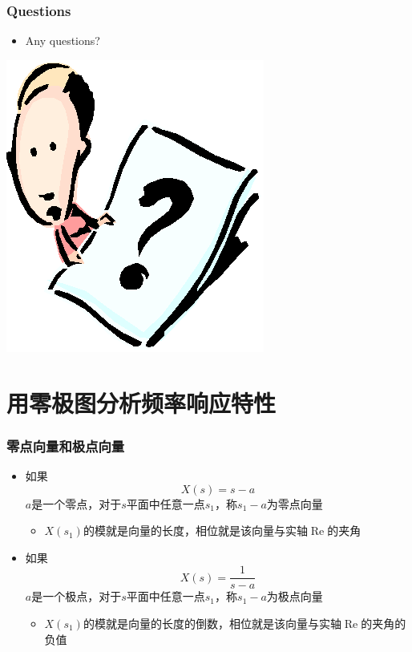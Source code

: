 \documentclass[CJKutf8,dvipsnames,table]{beamer}
\begin{document}
\begin{CJK*}{UTF8}{song}
  \begin{frame}
    \frametitle{Questions}
    \begin{itemize}
    \item Any questions?
    \end{itemize}
    \begin{center}
      \includegraphics[scale=.5]{question}
    \end{center}
  \end{frame}
  
  \section{用零极图分析频率响应特性}
  
  \begin{frame}
    \frametitle{零点向量和极点向量}
    \begin{itemize}
	\item 如果
	\[
	X(s)=s-a
	\]
	$a$是一个零点，对于$s$平面中任意一点$s_1$，称$s_1-a$为零点向量
		\begin{itemize}
		\item $X(s_1)$的模就是向量的长度，相位就是该向量与实轴$\operatorname{Re}$的夹角
		\end{itemize}
	\item 如果
	\[
	X(s)=\frac{1}{s-a}
	\]
	$a$是一个极点，对于$s$平面中任意一点$s_1$，称$s_1-a$为极点向量
		\begin{itemize}
		\item $X(s_1)$的模就是向量的长度的倒数，相位就是该向量与实轴$\operatorname{Re}$的夹角的负值
		\end{itemize}


\end{itemize}
\end{frame}
\end{CJK*}
\end{document}
